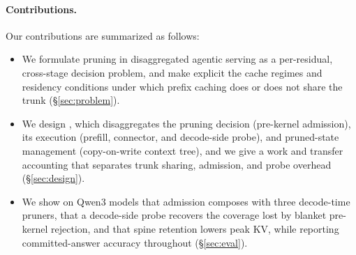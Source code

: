 \paragraph{Contributions.}
Our contributions are summarized as follows:
\begin{itemize}[leftmargin=*,itemsep=1pt,topsep=2pt]
\item We formulate pruning in disaggregated agentic serving as a per-residual, cross-stage decision problem, and make explicit the cache regimes and residency conditions under which prefix caching does or does not share the trunk (\S\ref{sec:problem}).
\item We design \sys, which disaggregates the pruning decision (pre-kernel admission), its execution (prefill, connector, and decode-side probe), and pruned-state management (copy-on-write context tree), and we give a work and transfer accounting that separates trunk sharing, admission, and probe overhead (\S\ref{sec:design}).
\item We show on Qwen3 models that admission composes with three decode-time pruners, that a decode-side probe recovers the coverage lost by blanket pre-kernel rejection, and that spine retention lowers peak KV, while reporting committed-answer accuracy throughout (\S\ref{sec:eval}).
\end{itemize}
